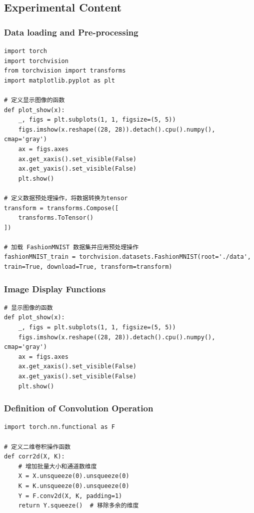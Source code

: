 \documentclass[a4paper,12pt]{article}
\begin{document}
\subsection{Experimental Content}
\subsubsection{Data loading and Pre-processing}
\begin{lstlisting}
import torch
import torchvision
from torchvision import transforms
import matplotlib.pyplot as plt

# 定义显示图像的函数
def plot_show(x):
    _, figs = plt.subplots(1, 1, figsize=(5, 5))
    figs.imshow(x.reshape((28, 28)).detach().cpu().numpy(), cmap='gray')
    ax = figs.axes
    ax.get_xaxis().set_visible(False)
    ax.get_yaxis().set_visible(False)
    plt.show()

# 定义数据预处理操作，将数据转换为tensor
transform = transforms.Compose([
    transforms.ToTensor()
])

# 加载 FashionMNIST 数据集并应用预处理操作
fashionMNIST_train = torchvision.datasets.FashionMNIST(root='./data', train=True, download=True, transform=transform)
\end{lstlisting}

\subsubsection{Image Display Functions}
\begin{lstlisting}
# 显示图像的函数
def plot_show(x):
    _, figs = plt.subplots(1, 1, figsize=(5, 5))
    figs.imshow(x.reshape((28, 28)).detach().cpu().numpy(), cmap='gray')
    ax = figs.axes
    ax.get_xaxis().set_visible(False)
    ax.get_yaxis().set_visible(False)
    plt.show()

\end{lstlisting}

\subsubsection{Definition of Convolution Operation}
\begin{lstlisting}
import torch.nn.functional as F

# 定义二维卷积操作函数
def corr2d(X, K):
    # 增加批量大小和通道数维度
    X = X.unsqueeze(0).unsqueeze(0)
    K = K.unsqueeze(0).unsqueeze(0)
    Y = F.conv2d(X, K, padding=1)
    return Y.squeeze()  # 移除多余的维度
\end{lstlisting}
\end{document}
